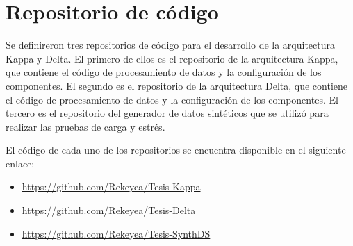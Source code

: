 \appendix

\chapter{Repositorio de código}

Se definireron tres repositorios de código para el desarrollo de la arquitectura Kappa y Delta.
El primero de ellos es el repositorio de la arquitectura Kappa, que contiene el código de procesamiento de datos y la configuración de los componentes.
El segundo es el repositorio de la arquitectura Delta, que contiene el código de procesamiento de datos y la configuración de los componentes.
El tercero es el repositorio del generador de datos sintéticos que se utilizó para realizar las pruebas de carga y estrés.

El código de cada uno de los repositorios se encuentra disponible en el siguiente enlace:

\begin{itemize}
    \item \url{https://github.com/Rekeyea/Tesis-Kappa}\\
    \item \url{https://github.com/Rekeyea/Tesis-Delta}\\
    \item \url{https://github.com/Rekeyea/Tesis-SynthDS}\\
\end{itemize}